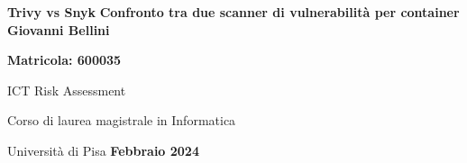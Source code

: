 \documentclass[12pt]{report}
\begin{document}
\begin{center}
   \vspace*{1cm}
   \Huge
   \textbf{Trivy vs Snyk}
   \vspace{0.5cm}
   \Large
   \vfill
   \textbf{Confronto tra due scanner di vulnerabilità per container}
   \vspace{1.5cm}
   \large
   \vfill
   \textbf{Giovanni Bellini}

   \textbf{Matricola: 600035}

   ICT Risk Assessment

      {Corso di laurea magistrale in Informatica}

      {Università di Pisa}
   \vfill
   \Large
   \textbf{Febbraio 2024}
\end{center}

\pagebreak
\tableofcontents



\end{document}
